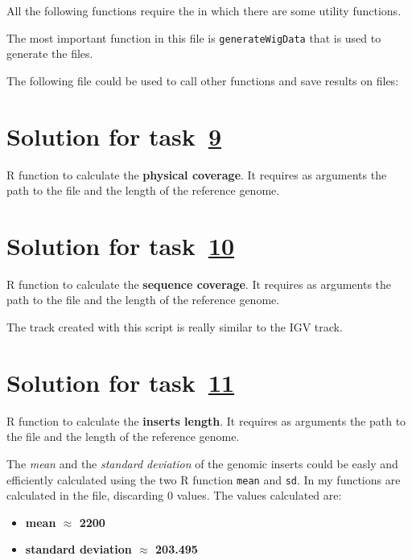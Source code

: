 All the following functions require the  in which there are some
utility functions.


The most important function in this file is \texttt{generateWigData} that is
used to generate the  files.

The following  file could be used to call other functions and
save results on  files:


\section{Solution for task~\hyperref[itm:2.9]{9}}
R function to calculate the \textbf{physical coverage}. It requires as arguments
the path to the  file and the length of the reference genome.
\scriptusage


\section{Solution for task~\hyperref[itm:2.10]{10}}
R function to calculate the \textbf{sequence coverage}. It requires as arguments
the path to the  file and the length of the reference genome.
\scriptusage

The track created with this script is really similar to the IGV track.

\section{Solution for task~\hyperref[itm:2.11]{11}}
R function to calculate the \textbf{inserts length}. It requires as arguments
the path to the  file and the length of the reference genome.
\scriptusage


The \textit{mean} and the \textit{standard deviation} of the genomic inserts 
could be easly and efficiently calculated using the two R function \texttt{mean}
and \texttt{sd}. In my functions are calculated in the  file,
discarding 0 values. The values calculated are:
\begin{itemize}
    \item \textbf{mean $\approx$ 2200}
    \item \textbf{standard deviation $\approx$ 203.495}
\end{itemize}

